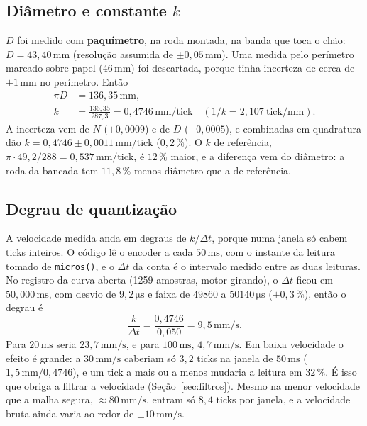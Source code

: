 \documentclass[11pt,a4paper]{article}
\newcommand{\unid}[1]{\,\mathrm{#1}}
\begin{document}
\subsection{Diâmetro e constante $k$}

$D$ foi medido com \textbf{paquímetro}, na roda montada, na banda que toca o chão: $D = 43{,}40\unid{mm}$ (resolução assumida de $\pm 0{,}05\unid{mm}$). Uma medida pelo perímetro marcado sobre papel (46\,mm) foi descartada, porque tinha incerteza de cerca de $\pm 1\unid{mm}$ no perímetro. Então
\begin{align}
  \pi D &= 136{,}35\unid{mm}, \\
  k &= \frac{136{,}35}{287{,}3} = 0{,}4746\unid{mm/tick} \quad (1/k = 2{,}107\ \text{tick/mm}).
\end{align}
A incerteza vem de $N$ ($\pm 0{,}0009$) e de $D$ ($\pm 0{,}0005$), e combinadas em quadratura dão $k = 0{,}4746 \pm 0{,}0011\unid{mm/tick}$ ($0{,}2\,\%$). O $k$ de referência, $\pi \cdot 49{,}2/288 = 0{,}537\unid{mm/tick}$, é $12\,\%$ maior, e a diferença vem do diâmetro: a roda da bancada tem $11{,}8\,\%$ menos diâmetro que a de referência.

\subsection{Degrau de quantização}

A velocidade medida anda em degraus de $k/\Delta t$, porque numa janela só cabem ticks inteiros. O código lê o encoder a cada $50\unid{ms}$, com o instante da leitura tomado de \texttt{micros()}, e o $\Delta t$ da conta é o intervalo medido entre as duas leituras. No registro da curva aberta (1259 amostras, motor girando), o $\Delta t$ ficou em $50{,}000\unid{ms}$, com desvio de $9{,}2\unid{\mu s}$ e faixa de $49860$ a $50140\unid{\mu s}$ ($\pm 0{,}3\,\%$), então o degrau é
\begin{equation}
  \frac{k}{\Delta t} = \frac{0{,}4746}{0{,}050} = 9{,}5\unid{mm/s}.
\end{equation}
Para $20\unid{ms}$ seria $23{,}7\unid{mm/s}$, e para $100\unid{ms}$, $4{,}7\unid{mm/s}$. Em baixa velocidade o efeito é grande: a $30\unid{mm/s}$ caberiam só $3{,}2$ ticks na janela de $50\unid{ms}$ ($1{,}5\unid{mm}/0{,}4746$), e um tick a mais ou a menos mudaria a leitura em $32\,\%$. É isso que obriga a filtrar a velocidade (Seção~\ref{sec:filtros}). Mesmo na menor velocidade que a malha segura, $\approx 80\unid{mm/s}$, entram só $8{,}4$ ticks por janela, e a velocidade bruta ainda varia ao redor de $\pm 10\unid{mm/s}$.
\end{document}
